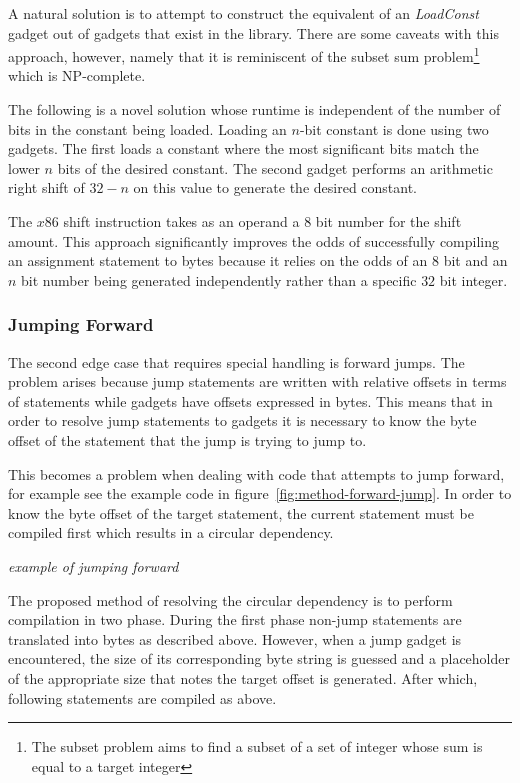     A natural solution is to attempt to construct the equivalent of an
    \emph{LoadConst} gadget out of gadgets that exist in the library. There are
    some caveats with this approach, however, namely that it is reminiscent of
    the subset sum problem\footnote{The subset problem aims to find a subset of
    a set of integer whose sum is equal to a target integer} which is
    NP-complete.

    The following is a novel solution whose runtime is independent of the number
    of bits in the constant being loaded. Loading an $n$-bit constant is done
    using two gadgets. The first loads a constant where the most significant
    bits match the lower $n$ bits of the desired constant. The second gadget
    performs an arithmetic right shift of $32-n$ on this value to generate the
    desired constant.

    The $x86$ shift instruction takes as an operand a $8$ bit number for the
    shift amount. This approach significantly improves the odds of successfully
    compiling an assignment statement to bytes because it relies on the odds of
    an $8$ bit and an $n$ bit number being generated independently rather than a
    specific $32$ bit integer.

    \subsubsection{Jumping Forward}

    The second edge case that requires special handling is forward jumps. The
    problem arises because jump statements are written with relative offsets in
    terms of statements while gadgets have offsets expressed in bytes. This
    means that in order to resolve jump statements to gadgets it is necessary to
    know the byte offset of the statement that the jump is trying to jump to.

    This becomes a problem when dealing with code that attempts to jump forward,
    for example see the example code in figure~\ref{fig:method-forward-jump}.
    In order to know the byte offset of the target statement, the current
    statement must be compiled first which results in a circular dependency.

    \emph{example of jumping forward}

    The proposed method of resolving the circular dependency is to perform
    compilation in two phase. During the first phase non-jump statements are
    translated into bytes as described above. However, when a jump gadget is
    encountered, the size of its corresponding byte string is guessed and a
    placeholder of the appropriate size that notes the target offset is
    generated. After which, following statements are compiled as above.

